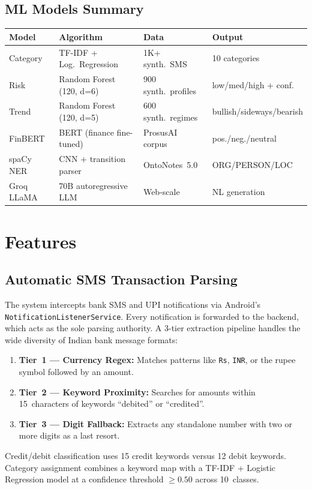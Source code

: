 \documentclass[12pt,a4paper]{article}
\begin{document}
\subsection{ML Models Summary}

\begin{table}[h!]
\centering
\renewcommand{\arraystretch}{1.2}
\small
\begin{tabularx}{\textwidth}{l l l X}
\toprule
\textbf{Model} & \textbf{Algorithm} & \textbf{Data} & \textbf{Output} \\
\midrule
Category   & TF-IDF + Log.\ Regression          & 1K+ synth.\ SMS        & 10 categories \\
Risk       & Random Forest (120, d=6)              & 900 synth.\ profiles   & low/med/high + conf.\ \\
Trend      & Random Forest (120, d=5)              & 600 synth.\ regimes    & bullish/sideways/bearish \\
FinBERT    & BERT (finance fine-tuned)             & ProsusAI corpus        & pos./neg./neutral \\
spaCy NER  & CNN + transition parser               & OntoNotes~5.0          & ORG/PERSON/LOC \\
Groq LLaMA & 70B autoregressive LLM               & Web-scale              & NL generation \\
\bottomrule
\end{tabularx}
\end{table}

\newpage
\section{Features}

\subsection{Automatic SMS Transaction Parsing}
The system intercepts bank SMS and UPI notifications via Android's \texttt{NotificationListenerService}. Every notification is forwarded to the backend, which acts as the sole parsing authority. A 3-tier extraction pipeline handles the wide diversity of Indian bank message formats:
\begin{enumerate}[leftmargin=1.5em]
  \item \textbf{Tier~1 --- Currency Regex:} Matches patterns like \texttt{Rs}, \texttt{INR}, or the rupee symbol followed by an amount.
  \item \textbf{Tier~2 --- Keyword Proximity:} Searches for amounts within 15~characters of keywords ``debited'' or ``credited''.
  \item \textbf{Tier~3 --- Digit Fallback:} Extracts any standalone number with two or more digits as a last resort.
\end{enumerate}
Credit/debit classification uses 15 credit keywords versus 12 debit keywords. Category assignment combines a keyword map with a TF-IDF + Logistic Regression model at a confidence threshold $\geq 0.50$ across 10~classes.
\end{document}
